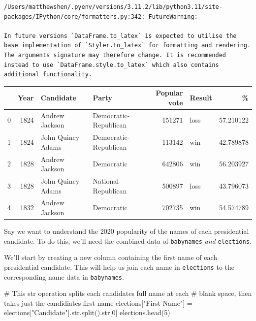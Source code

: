 \documentclass[
  letterpaper,
  DIV=11,
  numbers=noendperiod]{scrreprt}
\newenvironment{Shaded}{\begin{snugshade}}{\end{snugshade}}
\newcommand{\BuiltInTok}[1]{\textcolor[rgb]{0.00,0.23,0.31}{#1}}
\newcommand{\CommentTok}[1]{\textcolor[rgb]{0.37,0.37,0.37}{#1}}
\newcommand{\DecValTok}[1]{\textcolor[rgb]{0.68,0.00,0.00}{#1}}
\newcommand{\NormalTok}[1]{\textcolor[rgb]{0.00,0.23,0.31}{#1}}
\newcommand{\OperatorTok}[1]{\textcolor[rgb]{0.37,0.37,0.37}{#1}}
\newcommand{\StringTok}[1]{\textcolor[rgb]{0.13,0.47,0.30}{#1}}
\begin{document}
\begin{verbatim}
/Users/matthewshen/.pyenv/versions/3.11.2/lib/python3.11/site-packages/IPython/core/formatters.py:342: FutureWarning:

In future versions `DataFrame.to_latex` is expected to utilise the base implementation of `Styler.to_latex` for formatting and rendering. The arguments signature may therefore change. It is recommended instead to use `DataFrame.style.to_latex` which also contains additional functionality.
\end{verbatim}

\begin{tabular}{lrllrlr}
\toprule
{} &  Year &          Candidate &                  Party &  Popular vote & Result &          \% \\
\midrule
0 &  1824 &     Andrew Jackson &  Democratic-Republican &        151271 &   loss &  57.210122 \\
1 &  1824 &  John Quincy Adams &  Democratic-Republican &        113142 &    win &  42.789878 \\
2 &  1828 &     Andrew Jackson &             Democratic &        642806 &    win &  56.203927 \\
3 &  1828 &  John Quincy Adams &    National Republican &        500897 &   loss &  43.796073 \\
4 &  1832 &     Andrew Jackson &             Democratic &        702735 &    win &  54.574789 \\
\bottomrule
\end{tabular}

Say we want to understand the 2020 popularity of the names of each
presidential candidate. To do this, we'll need the combined data of
\texttt{babynames} \emph{and} \texttt{elections}.

We'll start by creating a new column containing the first name of each
presidential candidate. This will help us join each name in
\texttt{elections} to the corresponding name data in \texttt{babynames}.

\begin{Shaded}
\begin{Highlighting}[]
\CommentTok{\# This \textasciigrave{}str\textasciigrave{} operation splits each candidate\textquotesingle{}s full name at each }
\CommentTok{\# blank space, then takes just the candidiate\textquotesingle{}s first name}
\NormalTok{elections[}\StringTok{"First Name"}\NormalTok{] }\OperatorTok{=}\NormalTok{ elections[}\StringTok{"Candidate"}\NormalTok{].}\BuiltInTok{str}\NormalTok{.split().}\BuiltInTok{str}\NormalTok{[}\DecValTok{0}\NormalTok{]}
\NormalTok{elections.head(}\DecValTok{5}\NormalTok{)}
\end{Highlighting}
\end{Shaded}
\end{document}
